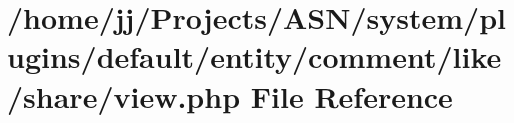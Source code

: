 \hypertarget{system_2plugins_2default_2entity_2comment_2like_2share_2view_8php}{}\section{/home/jj/\+Projects/\+A\+S\+N/system/plugins/default/entity/comment/like/share/view.php File Reference}
\label{system_2plugins_2default_2entity_2comment_2like_2share_2view_8php}
